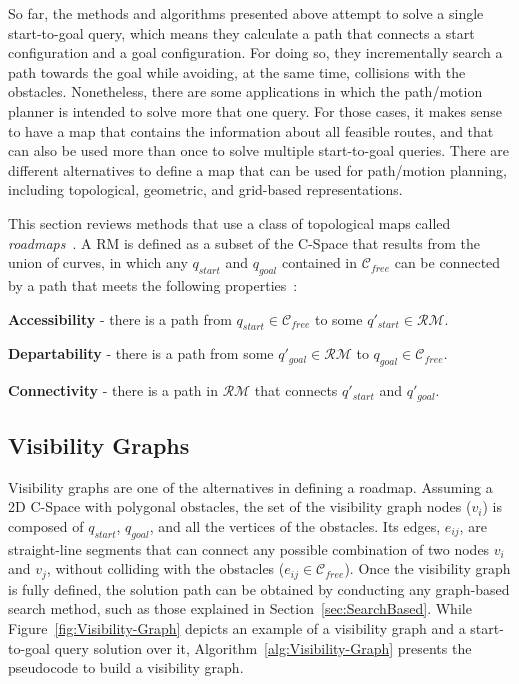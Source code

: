 So far, the methods and algorithms presented above attempt to solve a single
start-to-goal query, which means they calculate a path that connects a start
configuration and a goal configuration. For doing so, they incrementally search
a path towards the goal while avoiding, at the same time, collisions with the
obstacles. Nonetheless, there are some applications in which the path/motion
planner is intended to solve more that one query. For those cases, it makes
sense to have a map that contains the information about all feasible routes, and
that can also be used more than once to solve multiple start-to-goal queries.
There are different alternatives to define a map that can be used for
path/motion planning, including topological, geometric, and grid-based
representations.

This section reviews methods that use a class of topological maps called
\textit{roadmaps}~\cite{Canny1993, Latombe1991}. A \ac{RM} is defined as
a subset of the \ac{C-Space} that results from the union of curves, in which any
$q_{start}$ and $q_{goal}$ contained in $\mathcal{C}_{free}$ can be connected by
a path that meets the following properties~\cite{Choset2005}:
\begin{inparaenum}[1)] \item \textbf{Accessibility} - there is a path from
$q_{start}\in\mathcal{C}_{free}$ to some $q'_{start}\in\mathcal{RM}$.
\item \textbf{Departability} - there is a path from some
$q'_{goal}\in\mathcal{RM}$ to $q_{goal}\in\mathcal{C}_{free}$.
\item \textbf{Connectivity} - there is a path in $\mathcal{RM}$ that
connects $q'_{start}$ and $q'_{goal}$.
\end{inparaenum}

\subsection{Visibility Graphs}

Visibility graphs are one of the alternatives in defining a roadmap. Assuming a
\ac{2D} \ac{C-Space} with polygonal obstacles, the set of the visibility graph
nodes ($v_i$) is composed of $q_{start}$, $q_{goal}$, and all the vertices of
the obstacles. Its edges, $e_{ij}$, are straight-line segments that can connect
any possible combination of two nodes $v_i$ and $v_j$, without colliding with
the obstacles ($e_{ij}\in\mathcal{C}_{free}$). Once the visibility graph is
fully defined, the solution path can be obtained by conducting any graph-based
search method, such as those explained in Section~\ref{sec:SearchBased}.
While Figure~\ref{fig:Visibility-Graph} depicts an example of a visibility graph
and a start-to-goal query solution over it, Algorithm~\ref{alg:Visibility-Graph}
presents the pseudocode to build a visibility graph.

